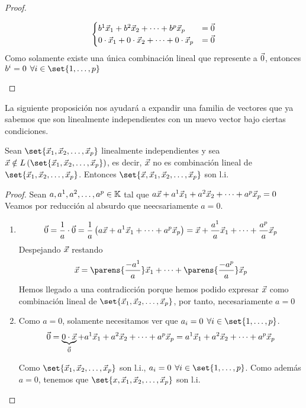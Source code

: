 \documentclass[../algebra_lineal.tex]{subfiles}
\begin{document}
\begin{proof}
\begin{enumerate}[itemindent=20pt]
        \[
        \begin{cases}
            {b}^{1}\vec{x}_{1}+{b}^{2}\vec{x}_{2}+\dots+{b}^{p}\vec{x}_{p} &= \vec{0} \\
            0 \cdot \vec{x}_1 + 0 \cdot \vec{x}_2 + \dots + 0 \cdot \vec{x}_p &= \vec{0}
        \end{cases}
        \]
        Como solamente existe una única combinación lineal que represente a $\vec{0}$, entonces $b^i = 0 \spc \forall i \in \set{1, \dots, p} $ 
    \end{enumerate}
\end{proof}

    La siguiente proposición nos ayudará a expandir una familia de vectores que ya sabemos que son linealmente independientes con un nuevo vector bajo ciertas condiciones.

    \begin{proposition}
        Sean $\set{\vlst{x}{p}}$ linealmente independientes y sea $\vx \notin \lspan{\set{\vlst{x}{p}}}$, es decir, $\vec{x}$ no es combinación lineal de $\set{\vlst{x}{p}}$. Entonces $\set{\vx, \vlst{x}{p}}$ son l.i.
    \end{proposition}

    \begin{proof}
        Sean $a,{a}^{1}, {a}^{2}, \dots, {a}^{p} \in \mathbb{K}$ tal que $a\vec{x} + {a}^{1}\vec{x}_{1}+{a}^{2}\vec{x}_{2}+\dots+{a}^{p}\vec{x}_{p} = 0$
        Veamos por reducción al absurdo que neecsariamente $a = 0$.
        \begin{enumerate}[itemindent=20pt]
            \item[\protect\fbox{si $a \ne 0$}] 
            \[
                \vec{0} = \frac{1}{a} \cdot \vec{0} = \frac{1}{a} \left( a\vec{x} + a^1 \vec{x}_1 + \dots + a^p\vec{x}_p  \right) = \vec{x} + \frac{a^1}{a}\vec{x}_1 + \dots + \frac{a^p}{a}\vec{x}_p
            \]
            Despejando $\vec{x}$ restando
            \[
                \vx = \parens{\frac{-a^1}{a}}\vx_1 + \dots + \parens{\frac{-a^p}{a}}\vx_p
            \]
            Hemos llegado a una contradicción porque hemos podido expresar $\vec{x}$ como combinación lineal de $\set{\vlst{x}{p}}$, por tanto, necesariamente $a=0$
            \item[\protect\fbox{si $a = 0$}] Como $a=0$, solamente necesitamos ver que $a_i=0 \spc \forall i \in \set{1, \dots, p}$.
            \[
                \vec{0} = \underbrace{0 \cdot \vec{x}}_{\vec{0}} + {a}^{1}\vec{x}_{1}+{a}^{2}\vec{x}_{2}+\dots+{a}^{p}\vec{x}_{p} = {a}^{1}\vec{x}_{1}+{a}^{2}\vec{x}_{2}+\dots+{a}^{p}\vec{x}_{p}
            \] 

            Como $\set{\vlst{x}{p}}$ son l.i., $a_i=0 \spc \forall i \in \set{1, \dots, p}$. Como además $a=0$, tenemos que $\set{x, \vlst{x}{p}}$ son l.i.
        \end{enumerate}
    \end{proof}
\end{document}
